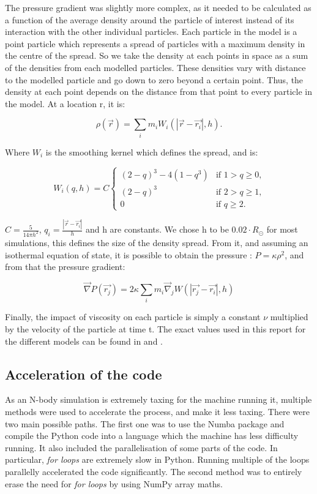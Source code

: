 \documentclass[a4paper,12pt]{article}
\begin{document}
The pressure gradient was slightly more complex, as it needed to be calculated as a function of the average density around the particle of interest instead of its interaction with the other individual particles. Each particle in the model is a point particle which represents a spread of particles with a maximum density in the centre of the spread. So we take the density at each points in space as a sum of the densities from each modelled particles. These densities vary with distance to the modelled particle and go down to zero beyond a certain point. Thus, the density at each point depends on the distance from that point to every particle in the model. At a location r, it is:

$$\rho(\vec{r}) = \sum_i m_i W_i(|\vec{r} - \vec{r_i}|, h).$$

Where $W_i$ is the smoothing kernel which defines the spread, and is:

\begin{equation}
  W_i(q,h) = C \begin{cases}
    (2-q)^3 - 4(1-q^3)&\text{if $1 > q\geq0$,}\\
    (2-q)^3 & \text{if $2>q\geq1$,}\\
    0 & \text{if $q\geq 2$.}
  \end{cases}
\end{equation}

$C=\frac{5}{14\pi h^2}$, $q_i=\frac{|\vec{r} - \vec{r_i}|}{h}$ and h are constants. We chose h to be $0.02\cdot R_\odot$ for most simulations, this defines the size of the density spread. From it, and assuming an isothermal equation of state, it is possible to obtain the pressure : $P=\kappa\rho^2$, and from that the pressure gradient:

$$\vec{\nabla} P(\vec{r_j}) = 2\kappa\sum_im_i\vec{\nabla}_jW(|\vec{r_j}-\vec{r_i}|,h)$$

Finally, the impact of viscosity on each particle is simply a constant $\nu$ multiplied by the velocity of the particle at time t. The exact values used in this report for the different models can be found in  and .

\subsection{Acceleration of the code}
As an N-body simulation is extremely taxing for the machine running it, multiple methods were used to accelerate the process, and make it less taxing. There were two main possible paths. The first one was to use the Numba package and compile the Python code into a language which the machine has less difficulty running. It also included the parallelisation of some parts of the code. In particular, \textit{for loops} are extremely slow in Python. Running multiple of the loops parallelly accelerated the code significantly. The second method was to entirely erase the need for \textit{for loops} by using NumPy array maths. 
\end{document}
